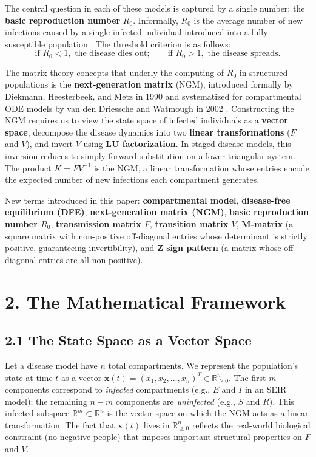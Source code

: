 \documentclass[12pt]{article}
\theoremstyle{plain}
\theoremstyle{definition}
\begin{document}
The central question in each of these models is captured by a single number: the
\textbf{basic reproduction number} $R_0$. Informally, $R_0$ is the average number of
new infections caused by a single infected individual introduced into a fully susceptible
population \cite{diekmann2010}. The threshold criterion is as follows:
\[
  \text{if } R_0 < 1, \text{ the disease dies out}; \qquad
  \text{if } R_0 > 1, \text{ the disease spreads.}
\]

The matrix theory concepts that underly the computing of $R_0$ in structured populations is the
\textbf{next-generation matrix} (NGM), introduced formally by Diekmann, Heesterbeek,
and Metz in 1990 \cite{diekmann1990} and systematized for compartmental ODE models by
van den Driessche and Watmough in 2002 \cite{vddriessche2002}. Constructing the NGM
requires us to view the state space of infected individuals as a \textbf{vector space},
decompose the disease dynamics into two \textbf{linear transformations} ($F$ and $V$),
and invert $V$ using \textbf{LU factorization}. In staged disease models, this inversion
reduces to simply forward substitution on a lower-triangular system. The product
$K = FV^{-1}$ is the NGM, a linear transformation whose entries encode the expected
number of new infections each compartment generates.

New terms introduced in this paper: \textbf{compartmental model},
\textbf{disease-free equilibrium (DFE)}, \textbf{next-generation matrix (NGM)},
\textbf{basic reproduction number $R_0$}, \textbf{transmission matrix $F$},
\textbf{transition matrix $V$}, \textbf{M-matrix} (a square matrix with non-positive
off-diagonal entries whose determinant is strictly positive, guaranteeing invertibility),
and \textbf{Z sign pattern} (a matrix whose off-diagonal entries are all non-positive).

\section*{2. \quad The Mathematical Framework}

\subsection*{2.1 \quad The State Space as a Vector Space}

Let a disease model have $n$ total compartments. We represent the population's state at
time $t$ as a vector $\mathbf{x}(t) = (x_1, x_2, \ldots, x_n)^T \in \mathbb{R}^n_{\geq 0}$.
The first $m$ components correspond to \emph{infected} compartments (e.g., $E$ and $I$
in an SEIR model); the remaining $n - m$ components are \emph{uninfected} (e.g., $S$
and $R$). This infected subspace $\mathbb{R}^m \subset \mathbb{R}^n$ is the vector space
on which the NGM acts as a linear transformation. The fact that $\mathbf{x}(t)$ lives in
$\mathbb{R}^n_{\geq 0}$ reflects the real-world biological constraint (no negative people)
that imposes important structural properties on $F$ and $V$.
\end{document}
